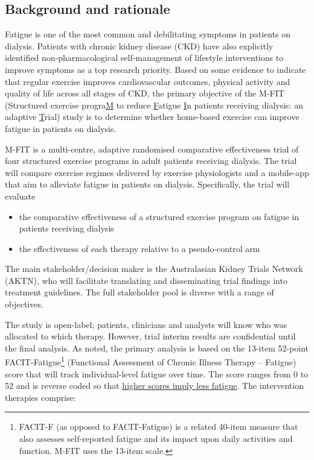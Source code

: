\documentclass[
]{article}
\begin{document}
\hypertarget{background}{%
  \subsection{Background and rationale}\label{background}}

Fatigue is one of the most common and debilitating symptoms in patients on dialysis.
Patients with chronic kidney disease (CKD) have also explicitly identified non-pharmacological self-management of lifestyle interventions to improve symptoms as a top research priority.
Based on some evidence to indicate that regular exercise improves cardiovascular outcomes, physical activity and quality of life across all stages of CKD, the primary objective of the M-FIT (Structured exercise progra\underline{M} to reduce \underline{F}atigue \underline{I}n patients receiving dialysis: an adaptive \underline{T}rial) study is to determine whether home-based exercise can improve fatigue in patients on dialysis.

M-FIT is a multi-centre, adaptive randomised comparative effectiveness trial of four structured exercise programs in adult patients receiving dialysis.
The trial will compare exercise regimes delivered by exercise physiologists and a mobile-app that aim to alleviate fatigue in patients on dialysis.
Specifically, the trial will evaluate

\begin{itemize}
  \item the comparative effectiveness of a structured exercise program on fatigue in patients receiving dialysis
  \item the effectiveness of each therapy relative to a pseudo-control arm
\end{itemize}

The main stakeholder/decision maker is the Australasian Kidney Trials Network (AKTN), who will facilitate translating and disseminating trial findings into treatment guidelines.
The full stakeholder pool is diverse with a range of objectives.

The study is open-label; patients, clinicians and analysts will know who was allocated to which therapy.
However, trial interim results are confidential until the final analysis.
As noted, the primary analysis is based on the 13-item 52-point FACIT-Fatigue\footnote{FACIT-F (as opposed to FACIT-Fatigue) is a related 40-item measure that also assesses self-reported fatigue and its impact upon daily activities and function. M-FIT uses the 13-item scale.} (Functional Assessment of Chronic Illness Therapy – Fatigue) score that will track individual-level fatigue over time.
The score ranges from 0 to 52 and is reverse coded so that \underline{higher scores imply less fatigue}.
The intervention therapies comprise:
\end{document}
